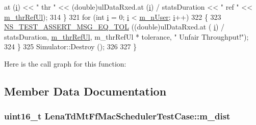 \begin{DoxyCode}
      at (\hyperlink{bernuolliDistribution_8m_a6f6ccfcf58b31cb6412107d9d5281426}{i}) << \textcolor{stringliteral}{"  thr "} << (double)ulDataRxed.at (\hyperlink{bernuolliDistribution_8m_a6f6ccfcf58b31cb6412107d9d5281426}{i}) / statsDuration << \textcolor{stringliteral}{" ref "} << 
      \hyperlink{classLenaTdMtFfMacSchedulerTestCase_a4ee165716b86a7013ed3b44ff014087f}{m\_thrRefUl});
314     \}
321   \textcolor{keywordflow}{for} (\textcolor{keywordtype}{int} \hyperlink{bernuolliDistribution_8m_a6f6ccfcf58b31cb6412107d9d5281426}{i} = 0; \hyperlink{bernuolliDistribution_8m_a6f6ccfcf58b31cb6412107d9d5281426}{i} < \hyperlink{classLenaTdMtFfMacSchedulerTestCase_a6e18eed688f5b1caee075826c8844267}{m\_nUser}; \hyperlink{bernuolliDistribution_8m_a6f6ccfcf58b31cb6412107d9d5281426}{i}++)
322     \{
323       \hyperlink{group__testing_ga9e7861b56b4e70db3b56044cb7a28e41}{NS\_TEST\_ASSERT\_MSG\_EQ\_TOL} ((\textcolor{keywordtype}{double})ulDataRxed.at (
      \hyperlink{bernuolliDistribution_8m_a6f6ccfcf58b31cb6412107d9d5281426}{i}) / statsDuration, \hyperlink{classLenaTdMtFfMacSchedulerTestCase_a4ee165716b86a7013ed3b44ff014087f}{m\_thrRefUl}, m\_thrRefUl * tolerance, \textcolor{stringliteral}{" Unfair Throughput!"});
324     \}
325   Simulator::Destroy ();
326 
327 \}
\end{DoxyCode}


Here is the call graph for this function\+:




\subsection{Member Data Documentation}
\subsubsection[{\texorpdfstring{m\+\_\+dist}{m_dist}}]{\setlength{\rightskip}{0pt plus 5cm}uint16\+\_\+t Lena\+Td\+Mt\+Ff\+Mac\+Scheduler\+Test\+Case\+::m\+\_\+dist\hspace{0.3cm}{\ttfamily [private]}}\hypertarget{classLenaTdMtFfMacSchedulerTestCase_a0aa6a40e725666a870d8c94c21ba156d}{}\label{classLenaTdMtFfMacSchedulerTestCase_a0aa6a40e725666a870d8c94c21ba156d}
